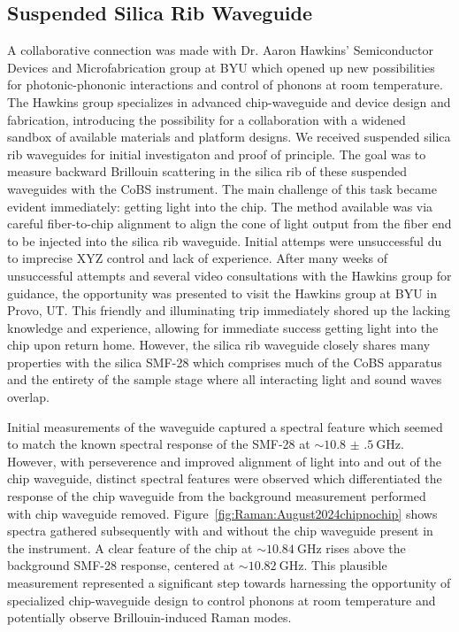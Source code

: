 \subsection{Suspended Silica Rib Waveguide}
\label{subsec:Raman:Target:Waveguide}

A collaborative connection was made with Dr. Aaron Hawkins' Semiconductor Devices and Microfabrication group at \ac{BYU} which opened up new possibilities for photonic-phononic interactions and control of phonons at room temperature. The Hawkins group specializes in advanced chip-waveguide and device design and fabrication, introducing the possibility for a collaboration with a widened sandbox of available materials and platform designs. We received suspended silica rib waveguides for initial investigaton and proof of principle. The goal was to measure backward Brillouin scattering in the silica rib of these suspended waveguides with the \ac{CoBS} instrument. The main challenge of this task became evident immediately: getting light into the chip. The method available was via careful fiber-to-chip alignment to align the cone of light output from the fiber end to be injected into the silica rib waveguide. Initial attemps were unsuccessful du to imprecise XYZ control and lack of experience. After many weeks of unsuccessful attempts and several video consultations with the Hawkins group for guidance, the opportunity was presented to visit the Hawkins group at \ac{BYU} in Provo, UT. This friendly and illuminating trip immediately shored up the lacking knowledge and experience, allowing for immediate success getting light into the chip upon return home. However, the silica rib waveguide closely shares many properties with the silica \ac{SMF-28} which comprises much of the \ac{CoBS} apparatus and the entirety of the sample stage where all interacting light and sound waves overlap.

Initial measurements of the waveguide captured a spectral feature which seemed to match the known spectral response of the \ac{SMF-28} at \(\sim\SI{10.8(5)}{\giga\hertz}\). However, with perseverence and improved alignment of light into and out of the chip waveguide, distinct spectral features were observed which differentiated the response of the chip waveguide from the background measurement performed with chip waveguide removed. Figure~\ref{fig:Raman:August2024chipnochip} shows spectra gathered subsequently with and without the chip waveguide present in the instrument. A clear feature of the chip at \(\sim\SI{10.84}{\giga\hertz}\) rises above the background \ac{SMF-28} response, centered at \(\sim\SI{10.82}{\giga\hertz}\). This plausible measurement represented a significant step towards harnessing the opportunity of specialized chip-waveguide design to control phonons at room temperature and potentially observe Brillouin-induced Raman modes.

